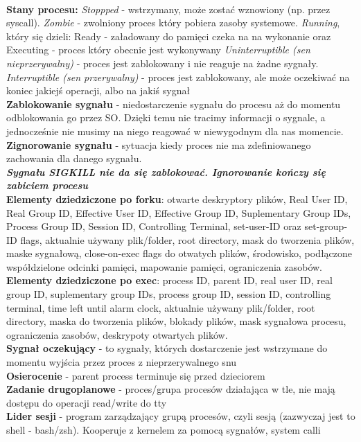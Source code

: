 \documentclass{article}
\begin{document}
\\ \textbf{Stany procesu:} \textit{Stoppped} - wstrzymany, może zostać wznowiony (np. przez syscall). \textit{Zombie} - zwolniony proces który pobiera zasoby systemowe. \textit{Running}, który się dzieli: Ready - załadowany do pamięci czeka na na wykonanie oraz Executing - proces który obecnie jest wykonywany
\textit{Uninterruptible (sen nieprzerywalny)} - proces jest zablokowany i nie reaguje na żadne sygnały. \textit{Interruptible (sen przerywalny)} -  proces jest zablokowany, ale może oczekiwać na koniec jakiejś operacji, albo na jakiś sygnał
\\ \textbf{Zablokowanie sygnału} - niedostarczenie sygnału do procesu aż do momentu odblokowania go przez SO. Dzięki temu nie tracimy informacji o sygnale, a jednocześnie nie musimy na niego reagować w niewygodnym dla nas momencie.
\\ \textbf{Zignorowanie sygnału} - sytuacja kiedy proces nie ma zdefiniowanego zachowania dla danego sygnału. 
\\ \textbf{\textit{Sygnału SIGKILL nie da się zablokować. Ignorowanie kończy się zabiciem procesu}}
\\ \textbf{Elementy dziedziczone po forku}: otwarte deskryptory plików, Real User ID, Real Group ID, Effective User ID, Effective Group ID, Suplementary Group IDs, Process Group ID, Session ID, Controlling Terminal, set-user-ID oraz set-group-ID flags, aktualnie używany plik/folder, root directory, mask do tworzenia plików, maske sygnałową, close-on-exec flags do otwatych plików, środowisko, podłączone współdzielone odcinki pamięci, mapowanie pamięci, ograniczenia zasobów.
\\ \textbf{Elementy dziedziczone po exec}: process ID, parent ID, real user ID, real group ID, suplementary group IDs, process group ID, session ID, controlling terminal, time left until alarm clock, aktualnie używany plik/folder, root directory, maska do tworzenia plików, blokady plików, mask sygnałowa procesu, ograniczenia zasobów, deskrypoty otwartych plików.
\\ \textbf{Sygnał oczekujący} -  to sygnały, których dostarczenie jest wstrzymane do momentu wyjścia przez proces z nieprzerywalnego snu
\\ \textbf{Osierocenie} - parent process terminuje się przed dzieciorem
\\ \textbf{Zadanie drugoplanowe} - proces/grupa procesów działająca w tle, nie mają dostępu do operacji read/write do tty
\\ \textbf{Lider sesji} - program zarządzający grupą procesów, czyli sesją (zazwyczaj jest to shell - bash/zsh). Kooperuje z kernelem za pomocą sygnałów, system calli
\end{document}
